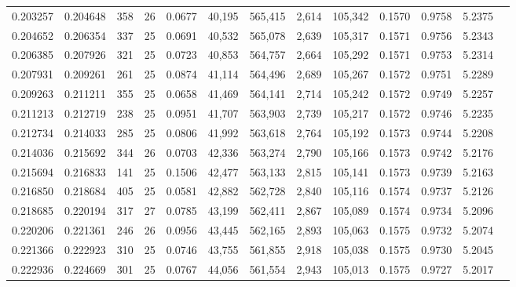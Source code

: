 \begin{tabular}{rrrrrrrrrrrrr}
0.203257 & 0.204648 &   358 &  26 &                                     0.0677 &  40,195 & 565,415 &   2,614 & 105,342 & 0.1570 & 0.9758 & 5.2375 \\
0.204652 & 0.206354 &   337 &  25 &                                     0.0691 &  40,532 & 565,078 &   2,639 & 105,317 & 0.1571 & 0.9756 & 5.2343 \\
0.206385 & 0.207926 &   321 &  25 &                                     0.0723 &  40,853 & 564,757 &   2,664 & 105,292 & 0.1571 & 0.9753 & 5.2314 \\
0.207931 & 0.209261 &   261 &  25 &                                     0.0874 &  41,114 & 564,496 &   2,689 & 105,267 & 0.1572 & 0.9751 & 5.2289 \\
0.209263 & 0.211211 &   355 &  25 &                                     0.0658 &  41,469 & 564,141 &   2,714 & 105,242 & 0.1572 & 0.9749 & 5.2257 \\
0.211213 & 0.212719 &   238 &  25 &                                     0.0951 &  41,707 & 563,903 &   2,739 & 105,217 & 0.1572 & 0.9746 & 5.2235 \\
0.212734 & 0.214033 &   285 &  25 &                                     0.0806 &  41,992 & 563,618 &   2,764 & 105,192 & 0.1573 & 0.9744 & 5.2208 \\
0.214036 & 0.215692 &   344 &  26 &                                     0.0703 &  42,336 & 563,274 &   2,790 & 105,166 & 0.1573 & 0.9742 & 5.2176 \\
0.215694 & 0.216833 &   141 &  25 &                                     0.1506 &  42,477 & 563,133 &   2,815 & 105,141 & 0.1573 & 0.9739 & 5.2163 \\
0.216850 & 0.218684 &   405 &  25 &                                     0.0581 &  42,882 & 562,728 &   2,840 & 105,116 & 0.1574 & 0.9737 & 5.2126 \\
0.218685 & 0.220194 &   317 &  27 &                                     0.0785 &  43,199 & 562,411 &   2,867 & 105,089 & 0.1574 & 0.9734 & 5.2096 \\
0.220206 & 0.221361 &   246 &  26 &                                     0.0956 &  43,445 & 562,165 &   2,893 & 105,063 & 0.1575 & 0.9732 & 5.2074 \\
0.221366 & 0.222923 &   310 &  25 &                                     0.0746 &  43,755 & 561,855 &   2,918 & 105,038 & 0.1575 & 0.9730 & 5.2045 \\
0.222936 & 0.224669 &   301 &  25 &                                     0.0767 &  44,056 & 561,554 &   2,943 & 105,013 & 0.1575 & 0.9727 & 5.2017 \\

\end{tabular}
